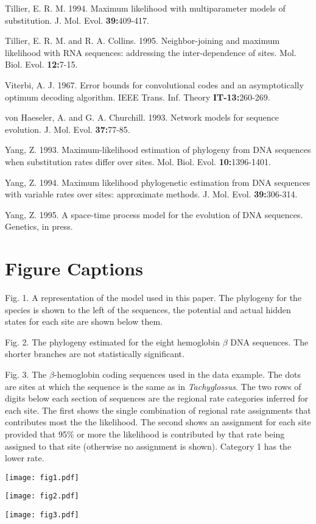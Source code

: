 \documentclass[12pt]{article}
\begin{document}
{{\sc Tillier, E. R. M.}  1994.  Maximum likelihood with multiparameter models of
substitution.  J. Mol. Evol. {\bf 39:}409-417.

{\sc Tillier, E. R. M.} and {\sc R. A. Collins.}  1995.  Neighbor-joining and maximum likelihood
with RNA sequences: addressing the inter-dependence of sites.  Mol.
Biol. Evol. {\bf 12:}7-15.

{\sc Viterbi, A. J.} 1967.  Error bounds for convolutional codes and an
asymptotically optimum decoding algorithm.  IEEE Trans. Inf. Theory {\bf IT-13:}260-269.

{\sc von Haeseler, A.} and {\sc G. A. Churchill.} 1993.
Network models for sequence evolution.
J. Mol. Evol. {\bf 37:}77-85.

{\sc Yang, Z.} 1993.  Maximum-likelihood estimation of phylogeny from DNA sequences
when substitution rates differ over sites.  Mol. Biol. Evol. {\bf 10:}1396-1401.

{\sc Yang, Z.} 1994.  Maximum likelihood phylogenetic estimation from DNA sequences
with variable rates over sites: approximate methods.  J. Mol. Evol. {\bf 39:}306-314.

{\sc Yang, Z.}  1995.  A space-time process model for the evolution of DNA sequences.
Genetics, in press.
}

\newpage

\section*{Figure Captions}

{\sc Fig.} 1.  A representation of the model used in this paper.  The
phylogeny for the species is shown to the left of the sequences, the
potential and actual hidden states for each site are shown below them.
\bigskip

\noindent
{\sc Fig.} 2.  The phylogeny estimated for the eight hemoglobin $\beta$ DNA
sequences.  The shorter branches are not statistically significant.
\bigskip

\noindent
{\sc Fig.} 3.  The $\beta$-hemoglobin coding sequences used in the data example.  The dots
are sites at which the sequence is the same as in {\it Tachyglossus}.
The two rows of digits
below each section of sequences are the regional rate categories inferred
for each site.  The first shows the single combination of regional rate
assignments that contributes most the the likelihood.  The second shows
an assignment for each site provided that 95\% or more the likelihood
is contributed by that rate being assigned to that site (otherwise no
assignment is shown).  Category 1 has the lower rate.

\newpage

\centerline{\texttt{[image: fig1.pdf]}}

\newpage

\centerline{\texttt{[image: fig2.pdf]}}

\newpage

\centerline{\texttt{[image: fig3.pdf]}}
\end{document}
